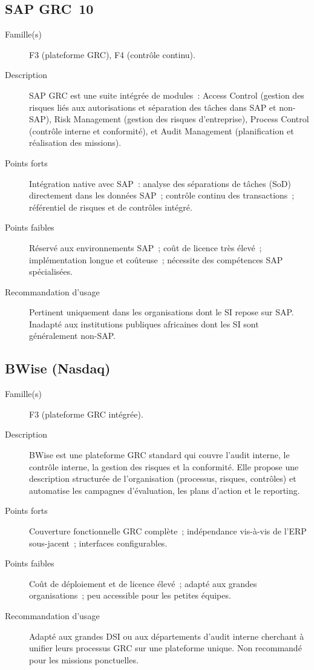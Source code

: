 \subsection*{SAP GRC~10}

\begin{description}
  \item[Famille(s)] F3 (plateforme GRC), F4 (contrôle continu).
  \item[Description] SAP GRC est une suite intégrée de modules~: Access
        Control (gestion des risques liés aux autorisations et séparation
        des tâches dans SAP et non-SAP), Risk Management (gestion des
        risques d'entreprise), Process Control (contrôle interne et
        conformité), et Audit Management (planification et réalisation
        des missions).
  \item[Points forts] Intégration native avec SAP~: analyse des
        séparations de tâches (SoD) directement dans les données SAP~;
        contrôle continu des transactions~; référentiel de risques et
        de contrôles intégré.
  \item[Points faibles] Réservé aux environnements SAP~; coût de licence
        très élevé~; implémentation longue et coûteuse~; nécessite des
        compétences SAP spécialisées.
  \item[Recommandation d'usage] Pertinent uniquement dans les organisations
        dont le SI repose sur SAP. Inadapté aux institutions publiques
        africaines dont les SI sont généralement non-SAP.
\end{description}

\subsection*{BWise (Nasdaq)}

\begin{description}
  \item[Famille(s)] F3 (plateforme GRC intégrée).
  \item[Description] BWise est une plateforme GRC standard qui couvre
        l'audit interne, le contrôle interne, la gestion des risques et la
        conformité. Elle propose une description structurée de l'organisation
        (processus, risques, contrôles) et automatise les campagnes d'évaluation,
        les plans d'action et le reporting.
  \item[Points forts] Couverture fonctionnelle GRC complète~; indépendance
        vis-à-vis de l'ERP sous-jacent~; interfaces configurables.
  \item[Points faibles] Coût de déploiement et de licence élevé~; adapté
        aux grandes organisations~; peu accessible pour les petites équipes.
  \item[Recommandation d'usage] Adapté aux grandes DSI ou aux départements
        d'audit interne cherchant à unifier leurs processus GRC sur une
        plateforme unique. Non recommandé pour les missions ponctuelles.
\end{description}

